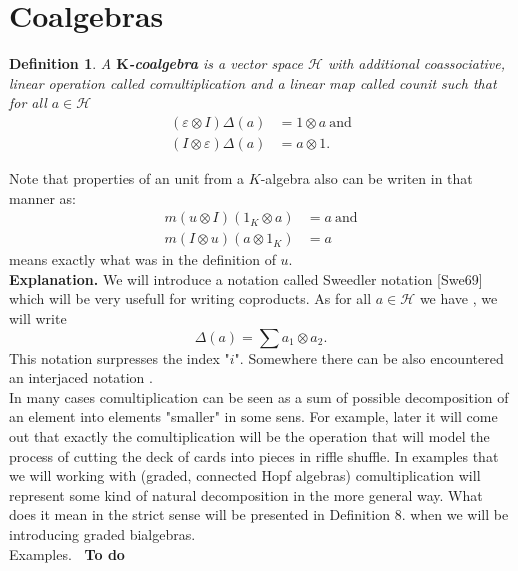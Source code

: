 \documentclass[a4paper, 12pt]{report}
\newtheorem{definition}{Definition}
\newcommand{\smalltodo}[1]{\textbf{\ To do}}
\begin{document}
\section{Coalgebras}
\begin{definition}
A \textbf{$\textbf{K}$-coalgebra} is a vector space $\mathcal{H}$
with additional coassociative, linear operation
 called comultiplication and
a linear map  called counit such that for all
$a \in \mathcal{H}$
\begin{align*}
(\varepsilon \otimes I)\Delta(a) &= 1 \otimes a \mathrm{\ and} \\
(I \otimes \varepsilon)\Delta(a) &= a \otimes 1.
\end{align*}
\end{definition}
Note that properties of an unit from a $K$-algebra also can be writen in that manner as:
\begin{align*}
m(u \otimes I)(1_K \otimes a) &= a \mathrm{\ and}\\
m(I \otimes u)(a \otimes 1_K) &= a
\end{align*}
means exactly what was in the definition of $u$. \\[8pt]
\textbf{Explanation.} We will introduce a notation called Sweedler notation [Swe69] which will be
very usefull
for writing coproducts. As for all $a \in \mathcal{H}$ we have
, we will write
\begin{equation*}
\Delta(a) = \displaystyle\sum a_1 \otimes a_2.
\end{equation*}
This notation surpresses the index "$i$". Somewhere there can be also encountered an interjaced
notation . \\
In many cases comultiplication can be seen as a sum of possible decomposition of an element into
elements "smaller" in some sens.
For example, later it will come out that exactly the comultiplication will be the operation that will
model the process of cutting the deck of cards into pieces in riffle shuffle. In examples that we will
working with (graded, connected Hopf algebras) comultiplication will represent some kind of natural
decomposition in the more general way. What does it mean in the strict sense will be presented in
Definition 8. when we will be introducing graded bialgebras. \\
Examples. \smalltodo{}  \\[8pt]
\end{document}

